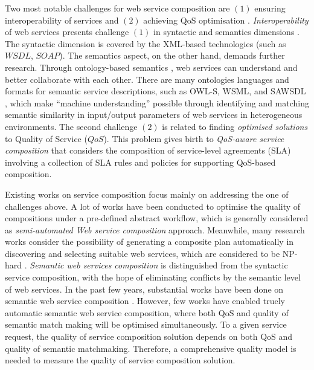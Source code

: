 \documentclass{IEEEtran}
\begin{document}
Two most notable challenges for web service composition are $(1)$ ensuring interoperability of services and $(2)$ achieving QoS optimisation \cite{fensel2011semantic}. \textit{Interoperability} of web services presents challenge $(1)$ in syntactic and semantics dimensions \cite{fensel2011semantic}. The syntactic dimension is covered by the XML-based technologies (such as $WSDL$, $SOAP$). The semantics aspect, on the other hand, demands further research. Through ontology-based semantics \cite{o2005review}, web services can understand and better collaborate with each other. There are many ontologies languages and formats for semantic service descriptions, such as OWL-S, WSML, and SAWSDL \cite{petrie2016web}, which make ``machine understanding'' possible through identifying and matching semantic similarity in input/output parameters of web services in heterogeneous environments. The second challenge $(2)$ is related to finding \textit{optimised solutions} to Quality of Service ($QoS$). This problem gives birth to \textit{QoS-aware service composition} that considers the composition of service-level agreements (SLA) \cite {sahai2002automated} involving a collection of SLA rules and policies for supporting QoS-based composition.

Existing works on service composition focus mainly on addressing the one of challenges above. A lot of works have been conducted to optimise the quality of compositions under a pre-defined abstract workflow, which is generally considered as \textit{semi-automated Web service composition} approach. Meanwhile, many research works consider the possibility of generating a composite plan automatically in discovering and selecting suitable web services, which are considered to be NP-hard \cite{moghaddam2014service}. \textit{Semantic web services composition} is distinguished from the syntactic service composition, with the hope of eliminating conflicts by the semantic level of web services. In the past few years, substantial works have been done on semantic web service composition \cite{fensel2011semantic,lecue2009optimizing}. However, few works have enabled truely automatic semantic web service composition, where both QoS and quality of semantic match making will be optimised simultaneously. To a given service request, the quality of service composition solution depends on both QoS and quality of semantic matchmaking. Therefore, a comprehensive quality model is needed to measure the quality of service composition solution.
\end{document}
